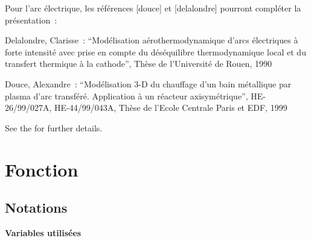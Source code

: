 Pour l'arc \'electrique,
les r\'ef\'erences [douce] et [delalondre] pourront compl\'eter la
pr\'esentation~:

\noindent{\bf [delalondre] }Delalondre, Clarisse~: ``Mod\'elisation a\'erothermodynamique d'arcs
\'electriques \`a forte intensit\'e avec prise en compte du d\'es\'equilibre
thermodynamique local et du transfert thermique \`a la cathode'', Th\`ese de
l'Universit\'e de Rouen, 1990

\noindent{\bf [douce]} Douce, Alexandre~: ``Modélisation 3-D du chauffage d'un
bain métallique par plasma d'arc transf\'er\'e. Application \`a un r\'eacteur
axisym\'etrique'', HE-26/99/027A, HE-44/99/043A, Th\`ese de l'Ecole Centrale
Paris et EDF, 1999

See the  for further details.

\section*{Fonction}

\subsection*{Notations}

{\bf Variables utilis\'ees}
\nopagebreak

